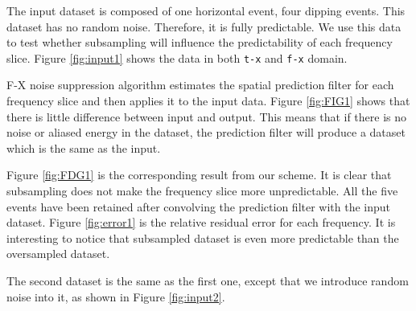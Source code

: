 \par
The input dataset is composed of one horizontal event, four dipping events.
This dataset has no random noise. Therefore, it is fully predictable. 
We use this data to test whether subsampling will influence the predictability 
of each frequency slice. Figure \ref{fig:input1} shows the data
in both {\tt t-x} and {\tt f-x} domain.  
\par
F-X noise suppression algorithm estimates the spatial prediction filter for 
each frequency slice and then applies it to the input data. 
Figure \ref{fig:FIG1} shows that there is little difference 
between input and output. This means that if there is no noise or aliased 
energy in the dataset, the prediction filter will produce a dataset which is 
the same as the input.
\par
Figure \ref{fig:FDG1} is the corresponding result from our scheme. It is clear 
that subsampling does not make the frequency slice more unpredictable. All 
the five events have been retained after convolving the prediction filter with 
the input dataset.
Figure \ref{fig:error1} is the relative residual error for each frequency. 
It is interesting to notice that subsampled dataset is even more predictable 
than the oversampled dataset. 
\par
The second dataset is the same as the first one, except that we introduce 
random noise into it, as shown in Figure \ref{fig:input2}. 
